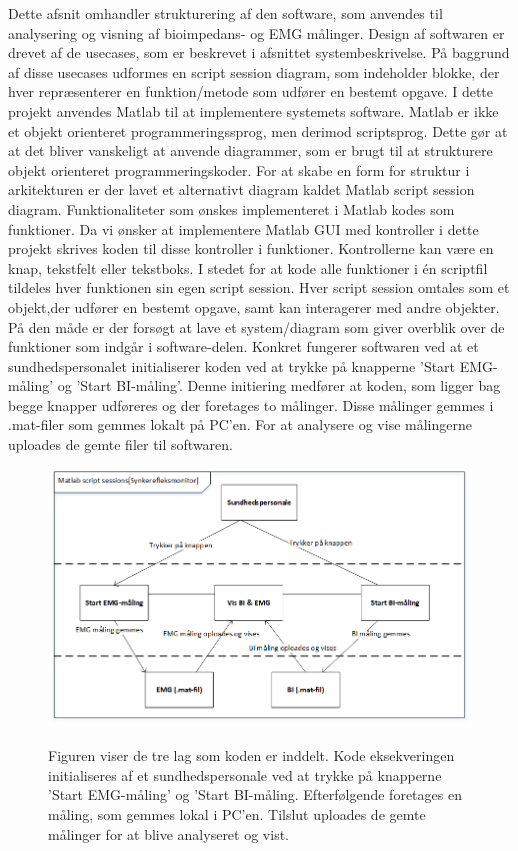 Dette afsnit omhandler strukturering af den  software, som anvendes til analysering og visning af bioimpedans- og EMG målinger. Design af softwaren er drevet af de usecases, som er beskrevet i afsnittet systembeskrivelse. På baggrund af disse usecases udformes en script session diagram, som indeholder blokke, der hver repræsenterer en funktion/metode som udfører en bestemt opgave. 
I dette projekt anvendes Matlab til at implementere systemets software. Matlab er ikke et objekt orienteret programmeringssprog, men derimod scriptsprog. Dette gør at at det bliver vanskeligt at anvende diagrammer, som er brugt til at strukturere objekt orienteret programmeringskoder. For at skabe en form for struktur i arkitekturen er der lavet et alternativt diagram kaldet   Matlab script session diagram. Funktionaliteter som ønskes implementeret i Matlab kodes som funktioner. Da vi ønsker at implementere Matlab GUI med kontroller i dette projekt skrives koden til disse kontroller i funktioner. Kontrollerne kan være en knap, tekstfelt eller tekstboks. I stedet for at kode alle funktioner i én scriptfil tildeles hver funktionen sin egen script session. Hver script session omtales som et objekt,der udfører en bestemt opgave, samt kan interagerer med andre objekter. På den måde er der forsøgt at lave et system/diagram som giver overblik over de funktioner som indgår i software-delen. Konkret fungerer softwaren ved at et sundhedspersonalet initialiserer koden ved at trykke på knapperne ’Start EMG-måling' og ’Start BI-måling’. Denne initiering medfører at koden, som ligger bag begge knapper udføreres og der foretages to målinger. Disse målinger gemmes i .mat-filer som gemmes lokalt på PC’en. For at analysere og vise målingerne  uploades de gemte filer til softwaren.  


\begin{figure}[H] 
\centering
{\includegraphics[width=\linewidth]
{Figure/ScriptSessionDia}}
\caption{Figuren viser de tre lag som koden er inddelt. Kode eksekveringen initialiseres af et sundhedspersonale ved at trykke på knapperne ’Start EMG-måling’ og ’Start BI-måling. Efterfølgende foretages en måling, som gemmes lokal i PC'en. Tilslut uploades de gemte målinger for at blive analyseret og vist.}
\label{figScrip}
\end{figure}



\citep{Aroom2009}

